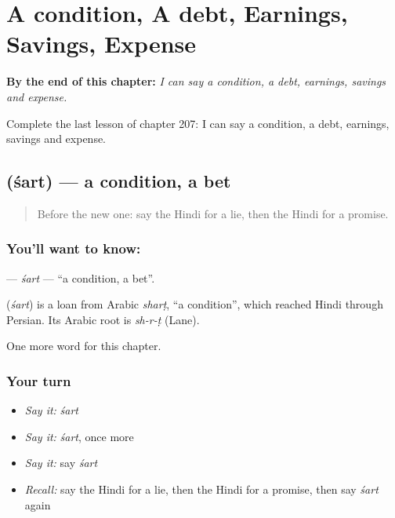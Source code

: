 
\chapter{A condition, A debt, Earnings, Savings, Expense}
\label{ch:hi-a-condition-a-debt-earnings-savings-expense}

\begin{chapteropening}
\textbf{By the end of this chapter:} \emph{I can say a condition, a debt, earnings, savings and expense.}

Complete the last lesson of chapter 207: I can say a condition, a debt, earnings, savings and expense.
\end{chapteropening}

\section[\texorpdfstring{\hi{शर्त} (śart)}{शर्त (śart)}]{ (śart) — a condition, a bet}

\label{lesson:HI-C207-sart}



\begin{quote}
Before the new one: say the Hindi for a lie, then the Hindi for a promise.
\end{quote}

\subsection*{You'll want to know: }
\textbf{} — \emph{śart} — \textquotedblleft{}a condition, a bet\textquotedblright{}.

\begin{cousinweb}
\textbf{} (\emph{śart}) is a loan from Arabic \emph{sharṭ}, \textquotedblleft{}a condition\textquotedblright{}, which reached Hindi through Persian. Its Arabic root is \emph{sh-r-ṭ} (Lane).
\end{cousinweb}

\begin{grammarlens}[title={What you've built}]
One more word for this chapter.
\end{grammarlens}

\subsection*{Your turn}
\begin{itemize}
\raggedright
  \item \emph{Say it:} \emph{śart}
  \item \emph{Say it:} \emph{śart}, once more
  \item \emph{Say it:} say \emph{śart}
  \item \emph{Recall:} say the Hindi for a lie, then the Hindi for a promise, then say \emph{śart} again
\end{itemize}

